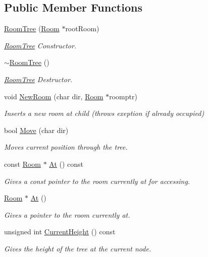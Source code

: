 \subsection*{Public Member Functions}
\begin{DoxyCompactItemize}
\item 
\hyperlink{classRoomTree_a2ea4adb06c7a1913d21ebaa6548a0167}{Room\-Tree} (\hyperlink{classRoom}{Room} $\ast$root\-Room)
\begin{DoxyCompactList}\small\item\em \hyperlink{classRoomTree}{Room\-Tree} Constructor. \end{DoxyCompactList}\item 
\hyperlink{classRoomTree_a1bd0bf9ba15d59e29127f762a3cdf036}{$\sim$\-Room\-Tree} ()
\begin{DoxyCompactList}\small\item\em \hyperlink{classRoomTree}{Room\-Tree} Destructor. \end{DoxyCompactList}\item 
void \hyperlink{classRoomTree_a8c2d8a4f8e8d33c3bffa8ecbb1124a60}{New\-Room} (char dir, \hyperlink{classRoom}{Room} $\ast$roomptr)
\begin{DoxyCompactList}\small\item\em Inserts a new room at child (throws exeption if already occupied) \end{DoxyCompactList}\item 
bool \hyperlink{classRoomTree_a537e9612b7ff7b399259589c2f0f8419}{Move} (char dir)
\begin{DoxyCompactList}\small\item\em Moves current position through the tree. \end{DoxyCompactList}\item 
const \hyperlink{classRoom}{Room} $\ast$ \hyperlink{classRoomTree_a151ca8b3555d4ddc46bfac760cb5977a}{At} () const 
\begin{DoxyCompactList}\small\item\em Gives a const pointer to the room currently at for accessing. \end{DoxyCompactList}\item 
\hyperlink{classRoom}{Room} $\ast$ \hyperlink{classRoomTree_ae0864011915cbaa34cd4bc53d0bf512b}{At} ()
\begin{DoxyCompactList}\small\item\em Gives a pointer to the room currently at. \end{DoxyCompactList}\item 
unsigned int \hyperlink{classRoomTree_a326bc29bec9bb483ddb49dd0ee2a70b7}{Current\-Height} () const 
\begin{DoxyCompactList}\small\item\em Gives the height of the tree at the current node. \end{DoxyCompactList}\end{DoxyCompactItemize}
